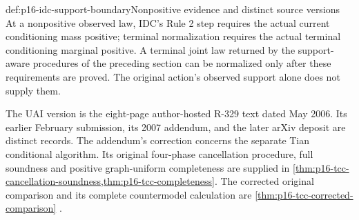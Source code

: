 \begin{proofboundary}{def:p16-idc-support-boundary}{Nonpositive evidence and distinct source versions}
At a nonpositive observed law, IDC's Rule 2 step requires the actual
current conditioning mass positive; terminal normalization requires the
actual terminal conditioning marginal positive. A terminal joint law
returned by the support-aware procedures of the preceding section can
be normalized only after these requirements are proved. The original
action's observed support alone does not supply them.

The UAI version is the eight-page author-hosted R-329 text dated May 2006.
Its earlier February submission, its 2007 addendum, and the later arXiv
deposit are distinct records. The addendum's correction concerns the
separate Tian conditional algorithm. Its original four-phase
cancellation procedure, full soundness and positive graph-uniform
completeness are supplied in
\cref{thm:p16-tcc-cancellation-soundness,thm:p16-tcc-completeness}.
The corrected original comparison and its complete countermodel
calculation are \cref{thm:p16-tcc-corrected-comparison}
\cite{Tian2004ConditionalCausalEffects,Shpitser2007ConditionalIdentificationAppendum}.
\end{proofboundary}
